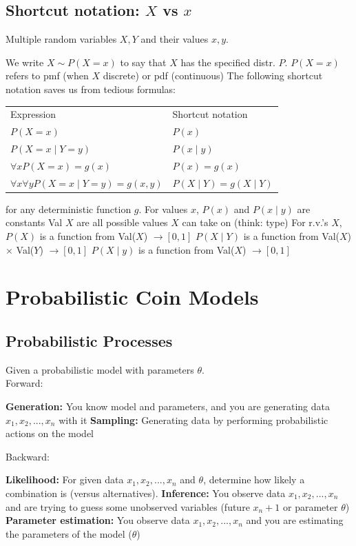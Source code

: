 \documentclass{article}
\begin{document}
	\subsection{Shortcut notation: $X$ vs $x$}
	Multiple random variables $X, Y$ and their values $x, y$.\\
	\begin{outline}
		\1 We write $X \sim P(X = x)$ to say that $X$ has the specified distr. $P$.
		\1 $P(X = x)$ refers to pmf (when $X$ discrete) or pdf (continuous)
		\1 The following shortcut notation saves us from tedious formulas:\\
		\begin{tabular}{ll}
			Expression & Shortcut notation \\
			$P(X = x)$ & $P(x)$ \\
			$P(X = x \;|\; Y = y)$ & $P(x \;|\; y)$ \\
			$\forall x P(X = x) = g(x)$ & $P(x) = g(x)$ \\
			$\forall x \forall y P(X = x \;|\; Y = y) = g(x, y)$ & $P(X \;|\; Y) = g(X \;|\; Y)$
		\end{tabular}
		\2 for any deterministic function $g$.
		\2 For values $x$, $P(x)$ and $P(x \;|\; y)$ are constants
		\2 Val $X$ are all possible values $X$ can take on (think: type)
		\2 For r.v.'s $X$, $P(X)$ is a function from Val($X$) $\rightarrow [0,1]$
		\2 $P(X \;|\; Y)$ is a function from Val($X$) $\times$ Val($Y$) $\rightarrow [0,1]$
		\2 $P(X \;|\; y)$ is a function from Val($X$) $\rightarrow [0,1]$
	\end{outline}


	\section{Probabilistic Coin Models}
	\subsection{Probabilistic Processes}
	Given a probabilistic model with parameters $\theta$.\\
	Forward:
	\begin{outline}
		\1 \textbf{Generation:} You know model and parameters, and you are generating data $x_1, x_2,...,x_n$ with it
		\1 \textbf{Sampling:} Generating data by performing probabilistic actions on the model
	\end{outline}
	Backward:
	\begin{outline}
		\1 \textbf{Likelihood:} For given data $x_1,x_2,...,x_n$ and $\theta$, determine how likely a combination is (versus alternatives).
		\1 \textbf{Inference:} You observe data $x_1,x_2,...,x_n$ and are trying to guess some unobserved variables (future $x_n+1$ or parameter $\theta$)
		\1 \textbf{Parameter estimation:} You observe data $x_1,x_2,...,x_n$ and you are estimating the parameters of the model ($\theta$)
	\end{outline}
\end{document}
